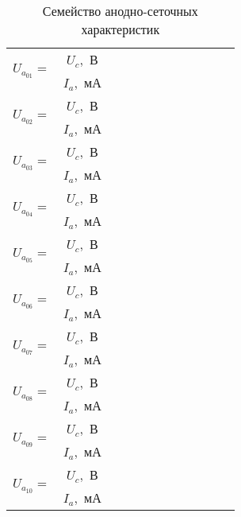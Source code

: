     \begin{table}[h!]
        \center
        \caption{Семейство анодно-сеточных характеристик}
        \begin{tabular}{|m{}|*{11}{C{.05}|}} \hline
         &
            \( U_c \),~В &&&&&&&&&& \\ 
        & \( I_a \),~мА &&&&&&&&&& \\ \hline
         &
            \( U_c \),~В &&&&&&&&&& \\ 
        & \( I_a \),~мА &&&&&&&&&& \\ \hline
         &
            \( U_c \),~В &&&&&&&&&& \\ 
        & \( I_a \),~мА &&&&&&&&&& \\ \hline
         &
            \( U_c \),~В &&&&&&&&&& \\ 
        & \( I_a \),~мА &&&&&&&&&& \\ \hline
         &
            \( U_c \),~В &&&&&&&&&& \\ 
        & \( I_a \),~мА &&&&&&&&&& \\ \hline
         &
            \( U_c \),~В &&&&&&&&&& \\ 
        & \( I_a \),~мА &&&&&&&&&& \\ \hline
         &
            \( U_c \),~В &&&&&&&&&& \\ 
        & \( I_a \),~мА &&&&&&&&&& \\ \hline
         &
            \( U_c \),~В &&&&&&&&&& \\ 
        & \( I_a \),~мА &&&&&&&&&& \\ \hline
         &
            \( U_c \),~В &&&&&&&&&& \\ 
        & \( I_a \),~мА &&&&&&&&&& \\ \hline
         &
            \( U_c \),~В &&&&&&&&&& \\ 
        & \( I_a \),~мА &&&&&&&&&& \\ \hline
        \end{tabular}
    \end{table}
    
